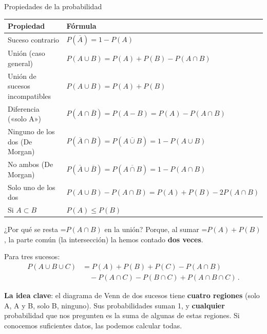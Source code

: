 \documentclass[11pt,a4paper]{article}
\newcommand{\fmm}[1]{\setbox0=\hbox{$#1$}\ifdim\wd0>\linewidth\fmdisp{#1}\else\mbox{\box0}\fi}
\newcommand{\fmdisp}[1]{\[\setbox2=\hbox{$\displaystyle #1$}\ifdim\wd2>\linewidth\resizebox{\linewidth}{!}{\box2}\else\box2\fi\]}
\newcommand{\fmuline}[1]{\textbf{\color{fmaccent}#1}}
\begin{document}
\begin{fmprop}{Propiedades de la probabilidad}
\begin{center}\renewcommand{\arraystretch}{1.5}\small\begin{tabularx}{\linewidth}{>{\raggedright\arraybackslash}p{5.2cm}>{\raggedright\arraybackslash}X}\toprule
\textbf{Propiedad} & \textbf{Fórmula}\\\midrule
Suceso contrario & $P(\overline{A})=1-P(A)$\\[3pt]
Unión (caso general) & $P(A\cup B)=P(A)+P(B)-P(A\cap B)$\\[3pt]
Unión de sucesos incompatibles & $P(A\cup B)=P(A)+P(B)$\\[3pt]
Diferencia («solo A») & $P(A\cap\overline{B})=P(A-B)=P(A)-P(A\cap B)$\\[3pt]
Ninguno de los dos (De Morgan) & $P(\overline{A}\cap\overline{B})=P(\overline{A\cup B})=1-P(A\cup B)$\\[3pt]
No ambos (De Morgan) & $P(\overline{A}\cup\overline{B})=P(\overline{A\cap B})=1-P(A\cap B)$\\[3pt]
Solo uno de los dos & $P(A\cup B)-P(A\cap B)=P(A)+P(B)-2P(A\cap B)$\\[3pt]
Si $A\subset B$ & $P(A)\leq P(B)$\\[3pt]
\bottomrule\end{tabularx}\end{center}

¿Por qué se resta \fmm{P(A\cap B)} en la unión? Porque, al sumar \fmm{P(A)+P(B)}, la parte común (la intersección) la hemos contado \textbf{dos veces}.

Para tres sucesos: 
\[\begin{aligned}P(A\cup B\cup C)&=P(A)+P(B)+P(C)-P(A\cap B)\\&\quad-P(A\cap C)-P(B\cap C)+P(A\cap B\cap C)\,.\end{aligned}\]


\begin{fmnote}\fmuline{La idea clave}: el diagrama de Venn de dos sucesos tiene \textbf{cuatro regiones} (solo A, A y B, solo B, ninguno). Sus probabilidades suman 1, y \textbf{cualquier} probabilidad que nos pregunten es la suma de algunas de estas regiones. Si conocemos suficientes datos, las podemos calcular todas.\end{fmnote}
\end{fmprop}
\end{document}
